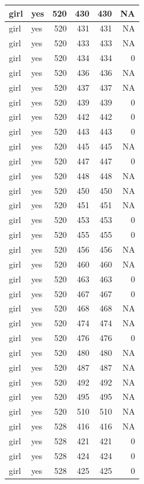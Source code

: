 \documentclass[man]{apa6}
\begin{document}
\begin{tabular}{l|l|r|r|r|r}
\hline
girl & yes & 520 & 430 & 430 & NA\\
\hline
girl & yes & 520 & 431 & 431 & NA\\
\hline
girl & yes & 520 & 433 & 433 & NA\\
\hline
girl & yes & 520 & 434 & 434 & 0\\
\hline
girl & yes & 520 & 436 & 436 & NA\\
\hline
girl & yes & 520 & 437 & 437 & NA\\
\hline
girl & yes & 520 & 439 & 439 & 0\\
\hline
girl & yes & 520 & 442 & 442 & 0\\
\hline
girl & yes & 520 & 443 & 443 & 0\\
\hline
girl & yes & 520 & 445 & 445 & NA\\
\hline
girl & yes & 520 & 447 & 447 & 0\\
\hline
girl & yes & 520 & 448 & 448 & NA\\
\hline
girl & yes & 520 & 450 & 450 & NA\\
\hline
girl & yes & 520 & 451 & 451 & NA\\
\hline
girl & yes & 520 & 453 & 453 & 0\\
\hline
girl & yes & 520 & 455 & 455 & 0\\
\hline
girl & yes & 520 & 456 & 456 & NA\\
\hline
girl & yes & 520 & 460 & 460 & NA\\
\hline
girl & yes & 520 & 463 & 463 & 0\\
\hline
girl & yes & 520 & 467 & 467 & 0\\
\hline
girl & yes & 520 & 468 & 468 & NA\\
\hline
girl & yes & 520 & 474 & 474 & NA\\
\hline
girl & yes & 520 & 476 & 476 & 0\\
\hline
girl & yes & 520 & 480 & 480 & NA\\
\hline
girl & yes & 520 & 487 & 487 & NA\\
\hline
girl & yes & 520 & 492 & 492 & NA\\
\hline
girl & yes & 520 & 495 & 495 & NA\\
\hline
girl & yes & 520 & 510 & 510 & NA\\
\hline
girl & yes & 528 & 416 & 416 & NA\\
\hline
girl & yes & 528 & 421 & 421 & 0\\
\hline
girl & yes & 528 & 424 & 424 & 0\\
\hline
girl & yes & 528 & 425 & 425 & 0\\

\end{tabular}
\end{document}
